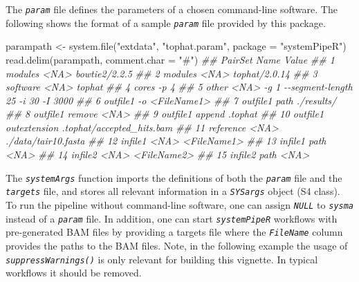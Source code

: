 \documentclass[14pt,]{article}
\newcommand{\hlstr}[1]{\textcolor[rgb]{0.251,0.627,0.251}{#1}}%
\newcommand{\hlcom}[1]{\textcolor[rgb]{0.502,0.502,0.502}{\textit{#1}}}%
\newcommand{\hlstd}[1]{\textcolor[rgb]{0.251,0.251,0.251}{#1}}%
\newenvironment{Shaded}{\begin{myshaded}}{\end{myshaded}}
\newcommand{\StringTok}[1]{\hlstr{#1}}
\newcommand{\DocumentationTok}[1]{\hlcom{#1}}
\newcommand{\OtherTok}[1]{{#1}}
\newcommand{\FunctionTok}[1]{\hlstd{#1}}
\newcommand{\AttributeTok}[1]{{#1}}
\newcommand{\NormalTok}[1]{\hlstd{#1}}
\begin{document}
The \emph{\texttt{param}} file defines the parameters of a chosen command-line software.
The following shows the format of a sample \emph{\texttt{param}} file provided by this package.

\begin{Shaded}
\begin{Highlighting}[]
\NormalTok{parampath }\OtherTok{\textless{}{-}} \FunctionTok{system.file}\NormalTok{(}\StringTok{"extdata"}\NormalTok{, }\StringTok{"tophat.param"}\NormalTok{, }\AttributeTok{package =} \StringTok{"systemPipeR"}\NormalTok{)}
\FunctionTok{read.delim}\NormalTok{(parampath, }\AttributeTok{comment.char =} \StringTok{"\#"}\NormalTok{)}
\DocumentationTok{\#\#      PairSet         Name                                  Value}
\DocumentationTok{\#\# 1    modules         \textless{}NA\textgreater{}                          bowtie2/2.2.5}
\DocumentationTok{\#\# 2    modules         \textless{}NA\textgreater{}                          tophat/2.0.14}
\DocumentationTok{\#\# 3   software         \textless{}NA\textgreater{}                                 tophat}
\DocumentationTok{\#\# 4      cores           {-}p                                      4}
\DocumentationTok{\#\# 5      other         \textless{}NA\textgreater{} {-}g 1 {-}{-}segment{-}length 25 {-}i 30 {-}I 3000}
\DocumentationTok{\#\# 6   outfile1           {-}o                            \textless{}FileName1\textgreater{}}
\DocumentationTok{\#\# 7   outfile1         path                             ./results/}
\DocumentationTok{\#\# 8   outfile1       remove                                   \textless{}NA\textgreater{}}
\DocumentationTok{\#\# 9   outfile1       append                                .tophat}
\DocumentationTok{\#\# 10  outfile1 outextension              .tophat/accepted\_hits.bam}
\DocumentationTok{\#\# 11 reference         \textless{}NA\textgreater{}                    ./data/tair10.fasta}
\DocumentationTok{\#\# 12   infile1         \textless{}NA\textgreater{}                            \textless{}FileName1\textgreater{}}
\DocumentationTok{\#\# 13   infile1         path                                   \textless{}NA\textgreater{}}
\DocumentationTok{\#\# 14   infile2         \textless{}NA\textgreater{}                            \textless{}FileName2\textgreater{}}
\DocumentationTok{\#\# 15   infile2         path                                   \textless{}NA\textgreater{}}
\end{Highlighting}
\end{Shaded}

The \emph{\texttt{systemArgs}} function imports the definitions of both the \emph{\texttt{param}} file
and the \emph{\texttt{targets}} file, and stores all relevant information in a \emph{\texttt{SYSargs}}
object (S4 class). To run the pipeline without command-line software, one can
assign \emph{\texttt{NULL}} to \emph{\texttt{sysma}} instead of a \emph{\texttt{param}} file. In addition, one can
start \emph{\texttt{systemPipeR}} workflows with pre-generated BAM files by providing a
targets file where the \emph{\texttt{FileName}} column provides the paths to the BAM files.
Note, in the following example the usage of \emph{\texttt{suppressWarnings()}} is only relevant for
building this vignette. In typical workflows it should be removed.
\end{document}
